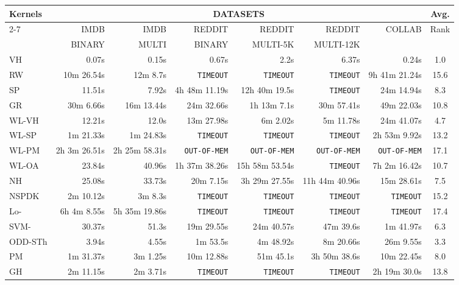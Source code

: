 \documentclass[twoside,11pt]{article}
\begin{document}
\begin{table}[t]
\centering
\scriptsize
\def\arraystretch{1.05}
\resizebox{\textwidth}{!} {
\begin{tabular}{lrrrrrrc} \toprule
\multirow{3}{*}{Kernels} & \multicolumn{6}{c}{DATASETS} & \multirow{2}{*}{Avg.} \\ \cline{2-7}
& IMDB & IMDB & REDDIT & REDDIT & REDDIT & \multirow{2}{*}{COLLAB} & \multirow{2}{*}{Rank}\\
& BINARY & MULTI & BINARY & MULTI-5K & MULTI-12K & & \\ 
\midrule
VH & 0.07s & 0.15s & 0.67s & 2.2s & 6.37s & 0.24s & 1.0 \\ 
RW & 10m 26.54s & 12m 8.7s & \texttt{TIMEOUT} & \texttt{TIMEOUT} & \texttt{TIMEOUT} & 9h 41m 21.24s & 15.6 \\ 
SP & 11.51s & 7.92s & 4h 48m 11.19s & 12h 40m 19.5s & \texttt{TIMEOUT} & 24m 14.94s & 8.3 \\ 
GR & 30m 6.66s & 16m 13.44s & 24m 32.66s & 1h 13m 7.1s & 30m 57.41s & 49m 22.03s & 10.8 \\ 
WL-VH & 12.21s & 12.0s & 13m 27.98s & 6m 2.02s & 5m 11.78s & 24m 41.07s & 4.7 \\ 
WL-SP & 1m 21.33s & 1m 24.83s & \texttt{TIMEOUT} & \texttt{TIMEOUT} & \texttt{TIMEOUT} & 2h 53m 9.92s & 13.2 \\ 
WL-PM & 2h 3m 26.51s & 2h 25m 58.31s & \texttt{OUT-OF-MEM} & \texttt{OUT-OF-MEM} & \texttt{OUT-OF-MEM} & \texttt{OUT-OF-MEM} & 17.1 \\ 
WL-OA & 23.84s & 40.96s & 1h 37m 38.26s & 15h 58m 53.54s & \texttt{TIMEOUT} & 7h 2m 16.42s & 10.7 \\ 
NH & 25.08s & 33.73s & 20m 7.15s & 3h 29m 27.55s & 11h 44m 40.96s & 15m 28.61s & 7.5 \\ 
NSPDK & 2m 10.12s & 3m 8.3s & \texttt{TIMEOUT} & \texttt{TIMEOUT} & \texttt{TIMEOUT} & \texttt{TIMEOUT} & 15.2 \\ 
Lo-  & 6h 4m 8.55s & 5h 35m 19.86s & \texttt{TIMEOUT} & \texttt{TIMEOUT} & \texttt{TIMEOUT} & \texttt{TIMEOUT} & 17.4 \\ 
SVM- & 30.37s & 51.3s & 19m 29.55s & 24m 40.57s & 47m 39.6s & 1m 41.97s & 6.3 \\ 
ODD-STh & 3.94s & 4.55s & 1m 53.5s & 4m 48.92s & 8m 20.66s & 26m 9.55s & 3.3 \\ 
PM & 1m 31.37s & 3m 1.25s & 10m 12.88s & 51m 45.1s & 3h 50m 38.6s & 10m 22.45s & 8.0 \\ 
GH & 2m 11.15s & 2m 3.71s & \texttt{TIMEOUT} & \texttt{TIMEOUT} & \texttt{TIMEOUT} & 2h 19m 30.0s & 13.8 \\ 

\end{tabular}}
\end{table}
\end{document}
